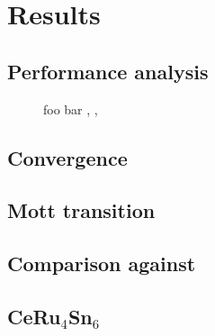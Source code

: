 
\chapter{Results}

\section{Performance analysis}

\begin{figure}[ht]
    \centering
    
    \caption{
        foo bar
        ,
        ,
    }
\end{figure}

\section{Convergence}

\section{Mott transition}

\section{Comparison against \quanty}

\section{\texorpdfstring{CeRu$_4$Sn$_6$}{CeRu4Sn6}}
